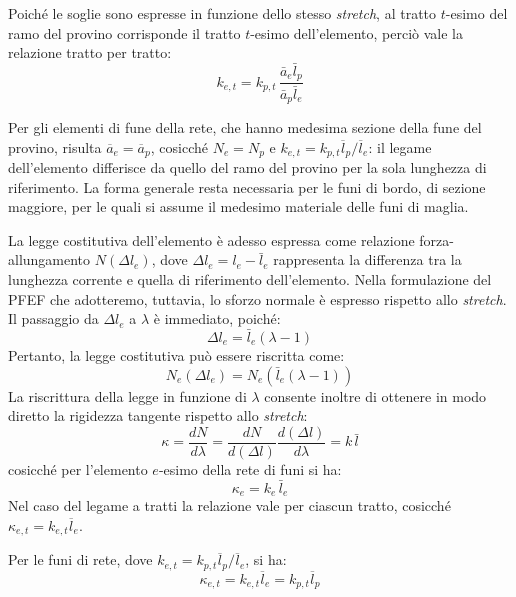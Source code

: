 Poiché le soglie sono espresse in funzione dello stesso \textit{stretch}, al tratto $t$-esimo del ramo del provino corrisponde il tratto $t$-esimo dell'elemento, perciò vale la relazione tratto per tratto: 
\begin{equation}
    k_{e,t} = k_{p,t} \, \frac{\bar{a}_e \bar{l}_p}{\bar{a}_p \bar{l}_e}  
    \label{eq:scalatura_tratti}
\end{equation}

Per gli elementi di fune della rete, che hanno medesima sezione della fune del provino, risulta $\overline{a}_e = \overline{a}_p$, cosicché $N_e = N_p$ e $k_{e,t} = k_{p,t} \overline{l}_p / \overline{l}_e$: il legame dell'elemento differisce da quello del ramo del provino per la sola lunghezza di riferimento. La forma generale resta necessaria per le funi di bordo, di sezione maggiore, per le quali si assume il medesimo materiale delle funi di maglia. 

La legge costitutiva dell'elemento è adesso espressa come relazione forza-allungamento $N(\Delta l_e)$, dove $\Delta l_e = l_e -\bar{l}_e$ rappresenta la differenza tra la lunghezza corrente e quella di riferimento dell'elemento. Nella formulazione del PFEF che adotteremo, tuttavia, lo sforzo normale è espresso rispetto allo \textit{stretch}. Il passaggio da $\Delta l_e$ a $\lambda$ è immediato, poiché:
\begin{equation}
    \Delta l_e = \bar{l}_e\left(\lambda - 1 \right)
\end{equation}
Pertanto, la legge costitutiva può essere riscritta come: 
\begin{equation}
    N_e\left(\Delta l_e\right) = N_e(\bar{l}_e\left(\lambda - 1 \right))
\end{equation}
La riscrittura della legge in funzione di $\lambda$ consente inoltre di ottenere in modo diretto la rigidezza tangente rispetto allo \textit{stretch}:
\begin{equation}
     \kappa = \frac{dN}{d\lambda} = \frac{dN}{d(\Delta l)} \frac{d(\Delta l)}{d\lambda} = k \, \bar{l}
\end{equation}
cosicché per l'elemento $e$-esimo della rete di funi si ha: 
\begin{equation}
    \kappa_e = k_e \, \bar{l}_e
    \label{eq:k_lambda}
\end{equation}  
Nel caso del legame a tratti la relazione vale per ciascun tratto, cosicché $\kappa_{e,t} = k_{e,t}\overline{l}_e$.

Per le funi di rete, dove $k_{e,t} = k_{p,t} \overline{l}_p / \overline{l}_e$, si ha:
\begin{equation}
    \kappa_{e,t} = k_{e,t}\overline{l}_e = k_{p,t} \overline{l}_p
\end{equation}

